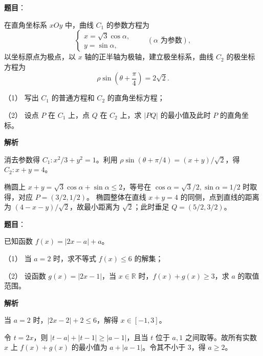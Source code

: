 \begin{answer}

\textbf{题目}：

在直角坐标系 \(xOy\) 中，曲线 \(C_1\) 的参数方程为
\nopagebreak[4]
\[
\begin{cases}
x=\sqrt3\cos\alpha,\\
y=\sin\alpha,
\end{cases}\qquad(\alpha\text{ 为参数}),
\]
以坐标原点为极点，以 \(x\) 轴的正半轴为极轴，建立极坐标系，曲线 \(C_2\) 的极坐标方程为
\nopagebreak[4]
\[
\rho\sin\left(\theta+\frac\pi4\right)=2\sqrt2.
\]

（1） 写出 \(C_1\) 的普通方程和 \(C_2\) 的直角坐标方程；

（2） 设点 \(P\) 在 \(C_1\) 上，点 \(Q\) 在 \(C_2\) 上，求 \(|PQ|\) 的最小值及此时 \(P\) 的直角坐标。

\textbf{解析}


消去参数得 \(C_1:x^2/3+y^2=1\)。利用 \(\rho\sin(\theta+\pi/4)=(x+y)/\sqrt2\)，得 \(C_2:x+y=4\)。


椭圆上 \(x+y=\sqrt3\cos\alpha+\sin\alpha\leq2\)，等号在 \(\cos\alpha=\sqrt3/2,\sin\alpha=1/2\) 时取得，对应 \(P=(3/2,1/2)\)。
椭圆整体在直线 \(x+y=4\) 的同侧，点到直线的距离为 \((4-x-y)/\sqrt2\)，故最小距离为 \(\sqrt2\)；此时垂足 \(Q=(5/2,3/2)\)。



\end{answer}
\begin{answer}

\textbf{题目}：

已知函数 \(f(x)=|2x-a|+a\)。

（1） 当 \(a=2\) 时，求不等式 \(f(x)\leq6\) 的解集；

（2） 设函数 \(g(x)=|2x-1|\)，当 \(x\in\mathbb R\) 时，\(f(x)+g(x)\geq3\)，求 \(a\) 的取值范围。

\textbf{解析}


当 \(a=2\) 时，\(|2x-2|+2\leq6\)，解得 \(x\in[-1,3]\)。


令 \(t=2x\)，则 \(|t-a|+|t-1|\geq|a-1|\)，且当 \(t\) 位于 \(a,1\) 之间取等。故所有实数 \(x\) 上 \(f(x)+g(x)\) 的最小值为 \(a+|a-1|\)。令其不小于 3，得 \(a\geq2\)。



\end{answer}